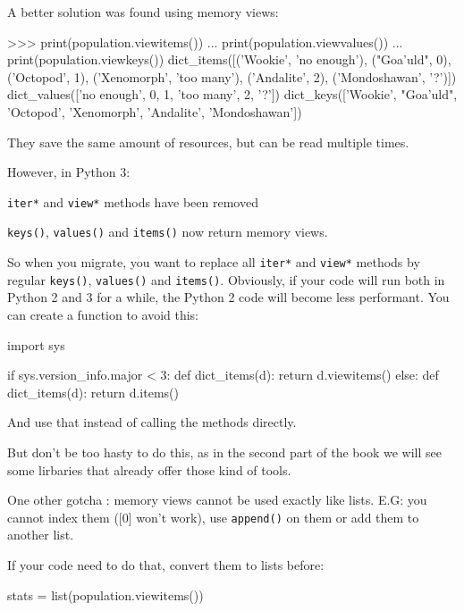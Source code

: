 A better solution was found using memory views:

\begin{py}
>>> print(population.viewitems())
... print(population.viewvalues())
... print(population.viewkeys())
dict_items([('Wookie', 'no enough'), ("Goa'uld", 0), ('Octopod', 1), ('Xenomorph', 'too many'), ('Andalite', 2), ('Mondoshawan', '?')])
dict_values(['no enough', 0, 1, 'too many', 2, '?'])
dict_keys(['Wookie', "Goa'uld", 'Octopod', 'Xenomorph', 'Andalite', 'Mondoshawan'])

\end{py}

They save the same amount of resources, but can be read multiple times.

However, in Python 3:

\begin{list}
\item \lstinline{iter*} and \lstinline{view*} methods have been removed
\item \lstinline{keys()}, \lstinline{values()} and \lstinline{items()} now return memory views.
\end{list}

So when you migrate, you want to replace all \lstinline{iter*} and \lstinline{view*} methods by regular \lstinline{keys()}, \lstinline{values()} and \lstinline{items()}. Obviously, if your code will run both in Python 2 and 3 for a while, the Python 2 code will become less performant. You can create a function to avoid this:

\begin{py}
import sys

if sys.version_info.major < 3:
    def dict_items(d):
        return d.viewitems()
else:
    def dict_items(d):
        return d.items()
\end{py}

And use that instead of calling the methods directly.

But don't be too hasty to do this, as in the second part of the book we will see some lirbaries that already offer those kind of tools.

One other gotcha : memory views cannot be used exactly like lists. E.G: you cannot index them ([0] won't work), use \lstinline{append()} on them or add them to another list.

If your code need to do that, convert them to lists before:

\begin{py}
stats = list(population.viewitems())
\end{py}

